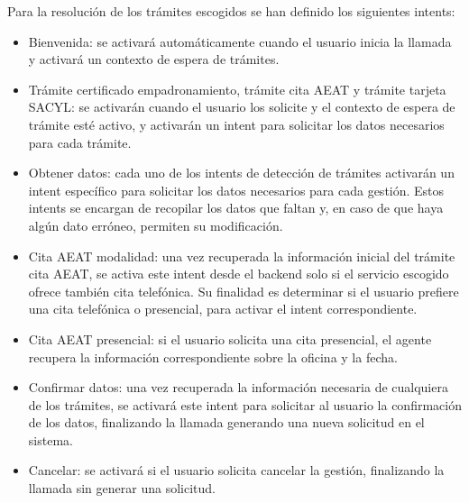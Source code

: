     Para la resolución de los trámites escogidos se han definido los siguientes intents: 
    \begin{itemize}
        \item Bienvenida: se activará automáticamente cuando el usuario inicia la llamada y activará un contexto de espera de trámites.
        \item Trámite certificado empadronamiento, trámite cita AEAT y trámite tarjeta SACYL: se activarán cuando el usuario los solicite y el contexto de espera de trámite esté activo, y activarán un intent para solicitar los datos necesarios para cada trámite. 
        \item Obtener datos: cada uno de los intents de detección de trámites activarán un intent específico para solicitar los datos necesarios para cada gestión. 
            Estos intents se encargan de recopilar los datos que faltan y, en caso de que haya algún dato erróneo, permiten su modificación.
        \item Cita AEAT modalidad: una vez recuperada la información inicial del trámite cita AEAT, se activa este intent desde el backend solo si el servicio escogido ofrece también cita telefónica. 
            Su finalidad es determinar si el usuario prefiere una cita telefónica o presencial, para activar el intent correspondiente.
        \item Cita AEAT presencial: si el usuario solicita una cita presencial, el agente recupera la información correspondiente sobre la oficina y la fecha.
        \item Confirmar datos: una vez recuperada la información necesaria de cualquiera de los trámites, se activará este intent para solicitar al usuario la confirmación de los datos, finalizando la llamada generando una nueva solicitud en el sistema.
        \item Cancelar: se activará si el usuario solicita cancelar la gestión, finalizando la llamada sin generar una solicitud.
    \end{itemize}

